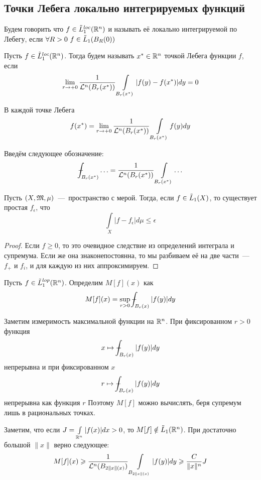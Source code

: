 \subsection{Точки Лебега локально интегрируемых функций}
\begin{definition}
    Будем говорить что $f \in \Tilde{L}_1^{loc}(\mathbb{R}^n)$ и называть её локально интегрируемой по Лебегу, если $\forall R > 0 \  f \in \Tilde{L}_1(B_R(0))$
\end{definition}
\begin{definition}
    Пусть $f \in \Tilde{L}_1^{loc}(\mathbb{R}^n)$. Тогда будем называть $x^* \in \mathbb{R}^n$ точкой Лебега функции $f$, если \[\lim\limits_{r \rightarrow +0} \dfrac{1}{\mathcal{L}^n(B_r(x^*))}\int\limits_{B_r(x^*)} |f(y) - f(x^*)|dy = 0\]
\end{definition}
\begin{note}
    В каждой точке Лебега \[f(x^*) = \lim\limits_{r \rightarrow +0} \dfrac{1}{\mathcal{L}^n(B_r(x^*))} \int\limits_{B_r(x^*)} f(y)dy\]
\end{note}
\begin{note}
    Введём следующее обозначение: \[\dashint_{B_r(x^*)} \ldots = \dfrac{1}{\LL^n(B_r(x^*))} \int\limits_{B_r(x^*)} \ldots \]
\end{note}
\begin{lemma}
    Пусть $(X, \mathfrak{M}, \mu)$~---~пространство с мерой. Тогда, если $f \in \Tilde{L}_1(X)$, то существует простая $f_\epsilon$, что \[\int\limits_X |f - f_\epsilon|d\mu \leq \epsilon\]
\end{lemma}
\begin{proof}
    Если $f \geq 0$, то это очевидное следствие из определений интеграла и супремума. Если же она знаконепостоянна, то мы разбиваем её на две части~---~$f_+$ и $f_i$, и для каждую из них аппроксимируем.
\end{proof}
\begin{definition}
    Пусть $f \in \Tilde{L}_1^{lop}(\mathbb{R}^n)$. Определим $M[f](x)$ как \[M[f](x) = \sup\limits_{r > 0}\dashint_{B_r(x)} |f(y)|dy\]    
\end{definition}
\begin{note}
    Заметим измеримость максимальной функции на $\mathbb{R}^n$. При фиксированном $r > 0$ функция \[x \mapsto \dashint_{B_r(x)}|f(y)|dy\]
    непрерывна и при фиксированном $x$ \[r \mapsto \dashint_{B_r(x)}|f(y)|dy\] непрерывна как функция $r$
    Поэтому $M[f]$ можно вычислять, беря супремум лишь в рациональных точках.
\end{note}
\begin{note}
    Заметим, что если $J = \int\limits_{\mathbb{R}^n} |f(x)|dx > 0$, то $M[f] \notin \Tilde{L}_1(\mathbb{R}^n)$. При достаточно большой $\|x\|$ верно следующее: \[M[f](x) \geqslant \dfrac{1}{\mathcal{L}^n(B_{2\|x\|(x)})}\int\limits_{B_{2\|x\|(x)}}|f(y)|dy \geqslant \dfrac{C}{\|x\|^n}J \]
\end{note}
